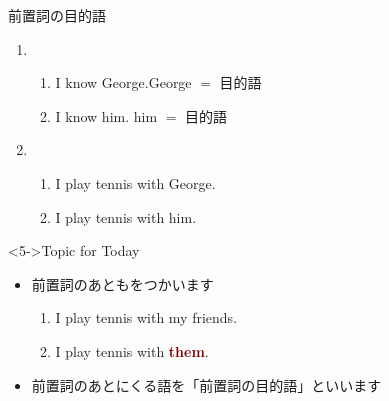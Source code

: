 \documentclass[aspectratio=169,xcolor={dvipsnames,table}]{beamer}
\begin{document}
\begin{frame}[plain]{前置詞の目的語}
 
\begin{enumerate}
 \item<1-> \begin{enumerate}
       \item<1-> I know George.\hfill{\scriptsize George $=$ 目的語}
       \item<2-> I know him. \hfill{\scriptsize him $=$ 目的語}
       \end{enumerate}
 \item<3-> \begin{enumerate}
       \item<3-> I play tennis with George.
	\item<4-> I play tennis with him.\hspace{20pt}
      \end{enumerate}
\end{enumerate}


\begin{block}<5->{Topic for Today}\small
\begin{itemize}[circle]
 \item 前置詞のあともをつかいます
       \begin{enumerate}
	\item I play tennis with my friends.
	\item I play tennis with \textcolor{Maroon}{\textbf{them}}.\hspace{30pt}
       \end{enumerate}
 \item 前置詞のあとにくる語を「前置詞の目的語」といいます
\end{itemize}
     \end{block}
\end{frame}
\end{document}
